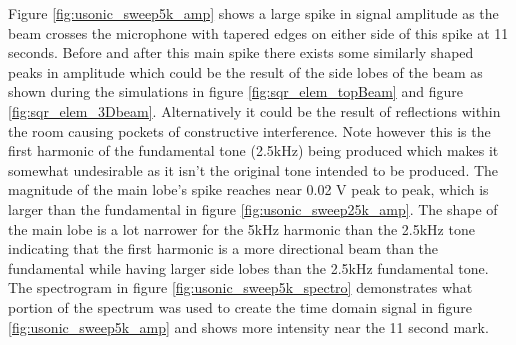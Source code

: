 Figure \ref{fig:usonic_sweep5k_amp} shows a large spike in signal amplitude as the beam crosses the microphone with tapered edges on either side of this spike at 11 seconds. Before and after this main spike there exists some similarly shaped peaks in amplitude which could be the result of the side lobes of the beam as shown during the simulations in figure \ref{fig:sqr_elem_topBeam} and figure \ref{fig:sqr_elem_3Dbeam}. Alternatively it could be the result of reflections within the room causing pockets of constructive interference. Note however this is the first harmonic of the fundamental tone (2.5kHz) being produced which makes it somewhat undesirable as it isn't the original tone intended to be produced.
The magnitude of the main lobe's spike reaches near 0.02 V peak to peak, which is larger than the fundamental in figure \ref{fig:usonic_sweep25k_amp}. The shape of the main lobe is a lot narrower for the 5kHz harmonic than the 2.5kHz tone indicating that the first harmonic is a more directional beam than the fundamental while having larger side lobes than the 2.5kHz fundamental tone.
The spectrogram in figure \ref{fig:usonic_sweep5k_spectro} demonstrates what portion of the spectrum was used to create the time domain signal in figure \ref{fig:usonic_sweep5k_amp} and shows more intensity near the 11 second mark.

